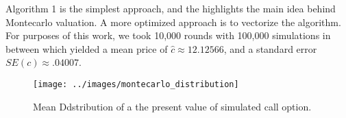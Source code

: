 \documentclass[../TGMAFFIRO.tex]{subfiles}
\begin{document}
\hfill \break
Algorithm 1 is the simplest approach, and the highlights the main idea behind Montecarlo valuation. A more optimized approach is to vectorize the algorithm. For purposes of this work, we took 10,000 rounds with 100,000 simulations in between which yielded a mean price of $\hat c \approx 12.12566$, and a standard error $SE(c) \approx .04007$.

\begin{figure}[h]
	\centering
  \texttt{[image: ../images/montecarlo\_distribution]}
  \caption{Mean Ddstribution of a the present value of simulated call option.}
\end{figure}
\end{document}
